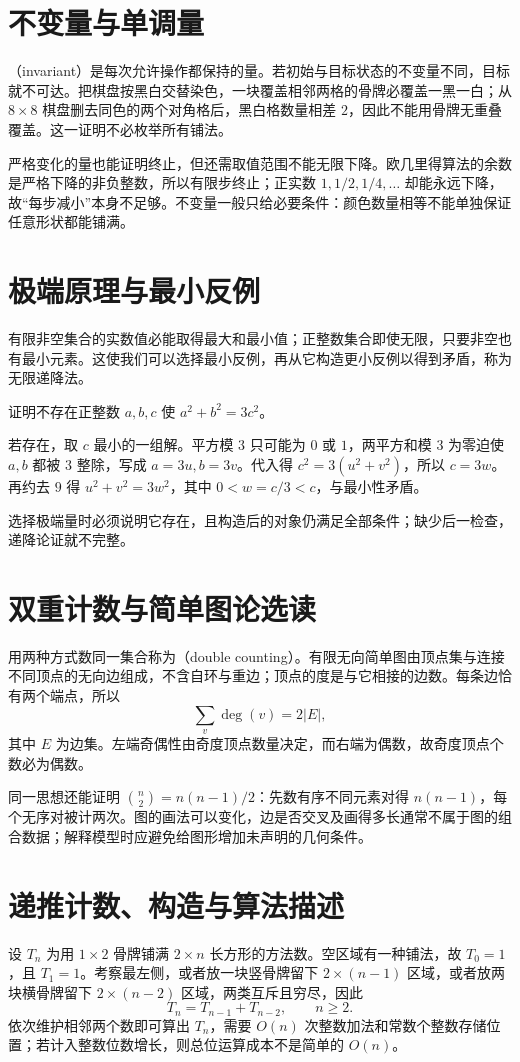 \documentclass[UTF8]{ctexbook}
\begin{document}
\section{不变量与单调量}
（invariant）是每次允许操作都保持的量。若初始与目标状态的不变量不同，目标就不可达。把棋盘按黑白交替染色，一块覆盖相邻两格的骨牌必覆盖一黑一白；从 $8\times8$ 棋盘删去同色的两个对角格后，黑白格数量相差 $2$，因此不能用骨牌无重叠覆盖。这一证明不必枚举所有铺法。

严格变化的量也能证明终止，但还需取值范围不能无限下降。欧几里得算法的余数是严格下降的非负整数，所以有限步终止；正实数 $1,1/2,1/4,\ldots$ 却能永远下降，故“每步减小”本身不足够。不变量一般只给必要条件：颜色数量相等不能单独保证任意形状都能铺满。

\section{极端原理与最小反例}
有限非空集合的实数值必能取得最大和最小值；正整数集合即使无限，只要非空也有最小元素。这使我们可以选择最小反例，再从它构造更小反例以得到矛盾，称为无限递降法。

\begin{example}
证明不存在正整数 $a,b,c$ 使 $a^2+b^2=3c^2$。
\end{example}
\begin{solve}
若存在，取 $c$ 最小的一组解。平方模 $3$ 只可能为 $0$ 或 $1$，两平方和模 $3$ 为零迫使 $a,b$ 都被 $3$ 整除，写成 $a=3u,b=3v$。代入得 $c^2=3(u^2+v^2)$，所以 $c=3w$。再约去 $9$ 得 $u^2+v^2=3w^2$，其中 $0<w=c/3<c$，与最小性矛盾。
\end{solve}
选择极端量时必须说明它存在，且构造后的对象仍满足全部条件；缺少后一检查，递降论证就不完整。

\section{双重计数与简单图论选读}
用两种方式数同一集合称为（double counting）。有限无向简单图由顶点集与连接不同顶点的无向边组成，不含自环与重边；顶点的度是与它相接的边数。每条边恰有两个端点，所以
\[
 \sum_{v}\deg(v)=2|E|,
\]
其中 $E$ 为边集。左端奇偶性由奇度顶点数量决定，而右端为偶数，故奇度顶点个数必为偶数。

同一思想还能证明 $\binom n2=n(n-1)/2$：先数有序不同元素对得 $n(n-1)$，每个无序对被计两次。图的画法可以变化，边是否交叉及画得多长通常不属于图的组合数据；解释模型时应避免给图形增加未声明的几何条件。

\section{递推计数、构造与算法描述}
设 $T_n$ 为用 $1\times2$ 骨牌铺满 $2\times n$ 长方形的方法数。空区域有一种铺法，故 $T_0=1$，且 $T_1=1$。考察最左侧，或者放一块竖骨牌留下 $2\times(n-1)$ 区域，或者放两块横骨牌留下 $2\times(n-2)$ 区域，两类互斥且穷尽，因此
\[
 T_n=T_{n-1}+T_{n-2},\qquad n\ge2.
\]
依次维护相邻两个数即可算出 $T_n$，需要 $O(n)$ 次整数加法和常数个整数存储位置；若计入整数位数增长，则总位运算成本不是简单的 $O(n)$。
\end{document}
